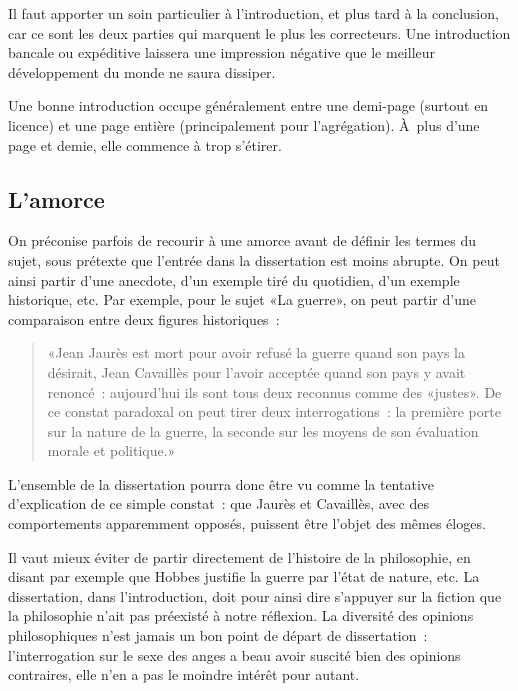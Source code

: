 \documentclass[a4paper,11pt]{article}
\begin{document}
Il faut apporter un soin particulier à l'introduction, et plus tard à la
conclusion, car ce sont les deux parties qui marquent le plus les
correcteurs. Une introduction bancale ou expéditive laissera une
impression négative que le meilleur développement du monde ne saura
dissiper.

\par

Une bonne introduction occupe généralement entre une demi-page (surtout
en licence) et une page entière (principalement pour
l'agrégation). À~plus d'une page et demie, elle commence à trop
s'étirer.


\subsection{L'amorce}

On préconise parfois de recourir à une amorce avant de définir les
termes du sujet, sous prétexte que l'entrée dans la dissertation est
moins abrupte. On peut ainsi partir d'une anecdote, d'un exemple tiré du
quotidien, d'un exemple historique, etc. Par exemple, pour le sujet «La
guerre», on peut partir d'une comparaison entre deux figures
historiques~:

\begin{quote}
  «Jean Jaurès est mort pour avoir refusé la guerre quand son pays la
  désirait, Jean Cavaillès pour l'avoir acceptée quand son pays y avait
  renoncé~: aujourd'hui ils sont tous deux reconnus comme des
  «justes». De ce constat paradoxal on peut tirer deux interrogations~:
  la première porte sur la nature de la guerre, la seconde sur les
  moyens de son évaluation morale et politique.»
\end{quote}
L'ensemble de la dissertation pourra donc être vu comme la tentative
d'explication de ce simple constat~: que Jaurès et Cavaillès, avec des
comportements apparemment opposés, puissent être l'objet des mêmes
éloges.

\par

Il vaut mieux éviter de partir directement de l'histoire de la
philosophie, en disant par exemple que Hobbes justifie la guerre par
l'état de nature, etc. La dissertation, dans l'introduction, doit pour
ainsi dire s'appuyer sur la fiction que la philosophie n'ait pas
préexisté à notre réflexion. La diversité des opinions philosophiques
n'est jamais un bon point de départ de dissertation~: l'interrogation
sur le sexe des anges a beau avoir suscité bien des opinions contraires,
elle n'en a pas le moindre intérêt pour autant.
\end{document}
